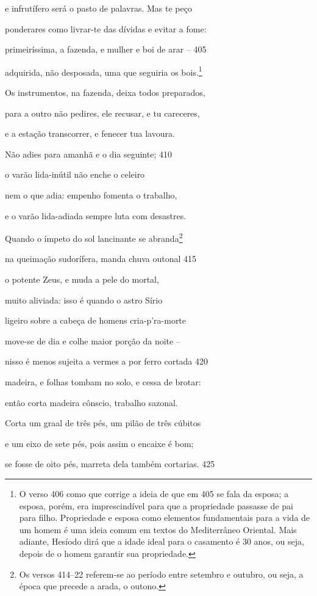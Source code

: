 e infrutífero será o pasto de palavras. Mas te peço

ponderares como livrar-te das dívidas e evitar a fome:

primeiríssima, a fazenda, e mulher e boi de arar -- \num{405}

adquirida, não desposada, uma que seguiria os bois.\footnote{O verso 406 como que corrige a ideia de que em 405 se fala da
esposa; a esposa, porém, era imprescindível para que a propriedade
passasse de pai para filho. Propriedade e esposa como elementos
fundamentais para a vida de um homem é uma ideia comum em textos do
Mediterrâneo Oriental. Mais adiante, Hesíodo dirá que a idade ideal para
o casamento é 30 anos, ou seja, depois de o homem garantir sua
propriedade.}

Os instrumentos, na fazenda, deixa todos preparados,

para a outro não pedires, ele recusar, e tu careceres,

e a estação transcorrer, e fenecer tua lavoura.

Não adies para amanhã e o dia seguinte; \num{410}

o varão lida-inútil não enche o celeiro

nem o que adia: empenho fomenta o trabalho,

e o varão lida-adiada sempre luta com desastres.

Quando o ímpeto do sol lancinante se abranda\footnote{Os versos 414--22 referem-se ao período entre setembro e outubro, ou seja, a época que precede a arada, o outono.}

na queimação sudorífera, manda chuva outonal \num{415}

o potente Zeus, e muda a pele do mortal,

muito aliviada: isso é quando o astro Sírio

ligeiro sobre a cabeça de homens cria-p'ra-morte

move-se de dia e colhe maior porção da noite --

nisso é menos sujeita a vermes a por ferro cortada \num{420}

madeira, e folhas tombam no solo, e cessa de brotar:

então corta madeira cônscio, trabalho sazonal.

Corta um graal de três pés, um pilão de três cúbitos

e um eixo de sete pés, pois assim o encaixe é bom;

se fosse de oito pés, marreta dela também cortarias. \num{425}

